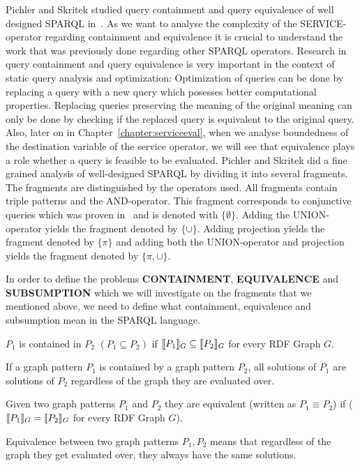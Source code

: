 Pichler and Skritek studied query containment and query equivalence of well
designed SPARQL in~\cite{pichler2014containment}. As we want to analyse the
complexity of the SERVICE-operator regarding containment and equivalence it 
is crucial to understand the work that was previously done regarding other
SPARQL operators.
Research in query containment and query equivalence is very important in the
context of static query analysis and optimization: Optimization of queries can
be done by replacing a query with a new query which posesses better computational properties. 
Replacing queries
preserving the meaning of the original meaning can only be done by checking if
the replaced query is equivalent to the original query. Also, later on in
Chapter~\ref{chapter:serviceeval}, when we analyse
boundedness of the destination variable of the service operator, we will see
that equivalence plays a role whether a query is feasible to be
evaluated. 
Pichler and Skritek did a fine grained analysis of well-designed SPARQL by
dividing it into several fragments. The fragments are distinguished by
the operators used. All fragments contain triple patterns and the AND-operator. This
fragment corresponds to conjunctive queries which was proven in~\cite{letelier2013static} 
and is denoted with $\{\emptyset\}$. Adding the UNION-operator yields the fragment 
denoted by $\{\cup\}$. Adding projection yields the fragment denoted by $\{\pi\}$ 
and adding both the UNION-operator and projection yields the fragment denoted by $\{\pi,\cup\}$.

In order to define the problems \textbf{CONTAINMENT}, \textbf{EQUIVALENCE} and
\textbf{SUBSUMPTION} which we will investigate on the fragments that we
mentioned above, we need to define what containment, equivalence and subsumption mean
in the SPARQL language.
\begin{definition}[Containment]
\medskip\noindent $P_1$ is contained in $P_2$ $(P_1 \subseteq P_2)$ 
if $\llbracket P_1 \rrbracket_G \subseteq
\llbracket P_2 \rrbracket_G$ for every RDF Graph $G$.
\end{definition}
If a graph pattern $P_1$ is contained by a graph pattern $P_2$, all
solutions of $P_1$ are solutions of $P_2$ regardless of the graph
they are evaluated over.

\begin{definition}[Equivalence]
Given two graph patterns $P_1$ and $P_2$ they are equivalent (written as $P_1
\equiv P_2$) if ($\llbracket P_1 \rrbracket_{G}  = \llbracket P_2 \rrbracket_{G} $ for every RDF Graph $G$).
\end{definition}
 Equivalence between two graph patterns $P_1,P_2$ means that regardless of the graph
 they get evaluated over, they always have the same solutions.

